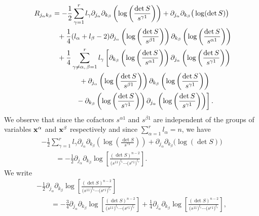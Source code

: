 \documentclass[11pt]{article}
\numberwithin{equation}{section}
\newcommand{\jalpha}{j_{\alpha}}
\newcommand{\kbeta}{k_{\beta}}
\newcommand{\lbeta}{l_{\beta}}
\newcommand{\lalpha}{l_{\alpha}}
\newcommand{\lgamma}{l_{\gamma}}
\begin{document}
\begin{gather}
R_{\jalpha \kbeta}=-\frac{1}{2}\sum_{\gamma =1}^{r}\lgamma \partial_{\jalpha}\partial_{\kbeta}\left(\log\left(\frac{\det S}{s^{\gamma 1}}\right)\right)+\partial_{\jalpha}\partial_{\kbeta}\big(\log(\det S)\big)\nonumber\\
\hphantom{R_{\jalpha \kbeta}=}{} + \frac{1}{4}(\lalpha+\lbeta-2) \partial_{\jalpha}\left(\log\left(\frac{\det S}{s^{\beta 1}}\right)\right)\partial_{\kbeta}\left(\log\left(\frac{\det S}{s^{\alpha 1}}\right)\right)\nonumber\\
\hphantom{R_{\jalpha \kbeta}=}{}+\frac{1}{4}\sum_{\gamma \neq \alpha, \,\beta=1}^{r}\lgamma \left[\partial_{\kbeta}\left(\log\left(\frac{\det S}{s^{\alpha 1}}\right)\right) \partial_{\jalpha}\left(\log\left(\frac{\det S}{s^{\gamma 1}}\right)\right)\right.\nonumber\\
\hphantom{R_{\jalpha \kbeta}=}{}
+\partial_{\jalpha}\left(\log\left(\frac{\det S}{s^{\beta 1}}\right)\right)\partial_{\kbeta}\left(\log\left(\frac{\det S}{s^{\gamma 1}}\right)\right)\nonumber\\
\left.\hphantom{R_{\jalpha \kbeta}=}{} -\partial_{\kbeta}\left(\log\left(\frac{\det S}{s^{\gamma 1}}\right)\right)\partial_{\jalpha}\left(\log\left(\frac{\det S}{s^{\gamma 1}}\right)\right)\right].\label{Riccialmostfinal}
\end{gather}
We observe that since the cofactors $s^{\alpha 1}$ and $s^{\beta 1}$ are independent of the groups of variables ${\bf x}^{\alpha}$ and ${\bf x}^{\beta}$ respectively and since $\sum\limits_{\alpha=1}^{r}\lalpha = n$, we have
\begin{gather*}
-\frac{1}{2}\sum_{\gamma =1}^{r}\lgamma \partial_{\jalpha}\partial_{\kbeta}\left(\log\left(\frac{\det S}{s^{\gamma 1}}\right)\right)+\partial_{\jalpha}\partial_{\kbeta}\big(\log(\det S)\big)\\
\qquad{} =-\frac{1}{2}\partial_{j_{\alpha}}\partial_{k_{\beta}}\log\left[\frac{(\det S)^{n-2}}{\big(s^{11}\big)^{l_{1}}\cdots \big(s^{r1}\big)^{l_{r}}}\right].
\end{gather*}
We write
\begin{gather}
-\frac{1}{2}\partial_{j_{\alpha}}\partial_{k_{\beta}}\log\left[\frac{(\det S)^{n-2}}{\big(s^{11}\big)^{l_{1}}\cdots \big(s^{r1}\big)^{l_{r}}}\right]\nonumber\\
\qquad{} =-\frac{3}{4}\partial_{j_{\alpha}}\partial_{k_{\beta}}\log\left[\frac{(\det S)^{n-2}}{\big(s^{11}\big)^{l_{1}}\cdots \big(s^{r1}\big)^{l_{r}}}\right] +\frac{1}{4}\partial_{j_{\alpha}}\partial_{k_{\beta}}\log\left[\frac{(\det S)^{n-2}}{\big(s^{11}\big)^{l_{1}}\cdots \big(s^{r1}\big)^{l_{r}}}\right],\label{simplif}
\end{gather}
\end{document}
